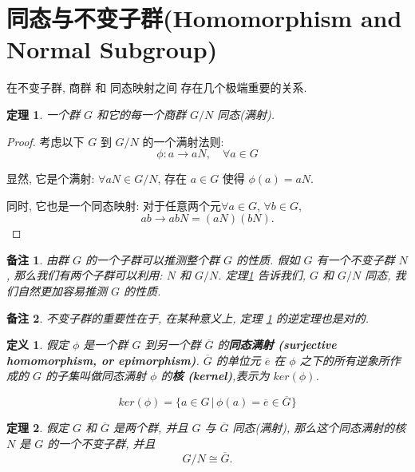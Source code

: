 \documentclass[utf8]{ctexbook}
\newtheorem{theorem}{定理}[section]
\newtheorem{definition}{定义}[section]
\newtheorem{memo}{备注}[section]
\begin{document}
\section{同态与不变子群(Homomorphism and Normal Subgroup)}

在不变子群, 商群 和 同态映射之间 存在几个极端重要的关系.

\begin{theorem}\label{thm_group_quotient_group}
一个群 $G$ 和它的每一个商群 $G/N$ 同态(满射).
\end{theorem}

\begin{proof}
考虑以下 $G$ 到 $G/N$ 的一个满射法则:
$$ \phi: a \longrightarrow aN, \quad \forall a \in G $$

显然, 它是个满射: $\forall aN \in G/N$, 存在 $a \in G$ 使得 $\phi(a) = aN$.

同时, 它也是一个同态映射: 对于任意两个元$\forall a \in G$, $\forall b \in G$, 
$$ ab \longrightarrow ab N = (aN) (bN) .$$

\end{proof}

\begin{memo}
由群 $G$ 的一个子群可以推测整个群 $G$ 的性质. 假如 $G$ 有一个不变子群 $N$, 那么我们有两个子群可以利用: $N$ 和 $G/N$. 定理\ref{thm_group_quotient_group} 告诉我们, $G$ 和 $G/N$ 同态, 我们自然更加容易推测 $G$ 的性质.
\end{memo}

\begin{memo}
不变子群的重要性在于, 在某种意义上, 定理 \ref{thm_group_quotient_group} 的逆定理也是对的.
\end{memo}

\begin{definition}
假定 $\phi$ 是一个群 $G$ 到另一个群 $\overline{G}$ 的\textbf{同态满射 (surjective homomorphism, or epimorphism)}. $\overline{G}$ 的单位元 $\overline{e}$ 在 $\phi$ 之下的所有逆象所作成的 $G$ 的子集叫做同态满射 $\phi$ 的\textbf{核 (kernel)},表示为 $ker(\phi)$.

\begin{equation}
ker(\phi) = \{ a \in G \, | \, \phi(a) = \overline{e} \in \overline{G} \}
\end{equation}
\end{definition}

\begin{theorem}\label{thm_group_quotient_group_inv}
假定 $G$ 和 $\overline{G}$ 是两个群, 并且 $G$ 与 $\overline{G}$ 同态(满射), 那么这个同态满射的核 $N$ 是 $G$ 的一个不变子群, 并且
$$ G/N \cong \overline{G} . $$
\end{theorem}
\end{document}
